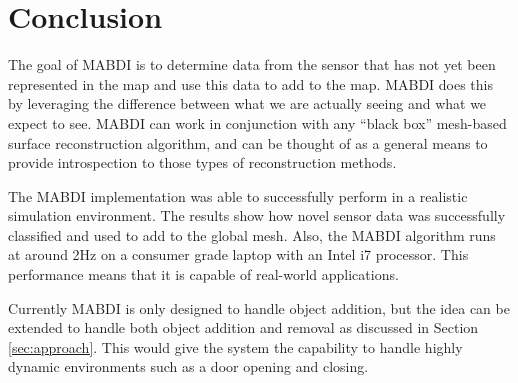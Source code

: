\chapter{Conclusion} \label{chapter:conclusion}

The goal of MABDI is to determine data from the sensor that has not yet been
represented in the map and use this data to add to the map. MABDI does this by
leveraging the difference between what we are actually seeing and what we expect
to see. MABDI can work in conjunction with any ``black box'' mesh-based surface
reconstruction algorithm, and can be thought of as a general means to provide
introspection to those types of reconstruction methods.

 The MABDI implementation was able to successfully perform in a realistic
 simulation environment. The results show how novel sensor data was
 successfully classified and used to add to the global mesh. Also, the MABDI
 algorithm runs at around 2Hz on a consumer grade laptop with an Intel i7
 processor. This performance means that it is capable of real-world
 applications.

 Currently MABDI is only designed to handle object addition, but the idea can be
 extended to handle both object addition and removal as discussed in Section
 \ref{sec:approach}. This would give the system the capability to handle highly
 dynamic environments such as a door opening and closing.
